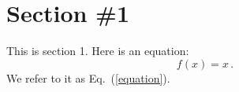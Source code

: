 \section{Section \#1}

This is section 1.
Here is an equation:
\begin{equation}
  f(x) = x \, . \label{equation} %
\end{equation}
We refer to it as Eq.~(\ref{equation}).

